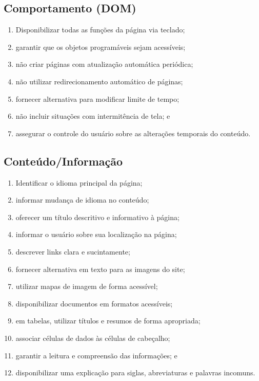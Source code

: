 \documentclass[
  12pt,
  openright,
  twoside,
  a4paper,
  english,
  french,
  spanish,
  brazil
]{abntex2}
\begin{document}
\subsection{Comportamento (DOM)}

\begin{enumerate}
  \item Disponibilizar todas as funções da página via teclado;
  \item garantir que os objetos programáveis sejam acessíveis;
  \item não criar páginas com atualização automática periódica;
  \item não utilizar redirecionamento automático de páginas;
  \item fornecer alternativa para modificar limite de tempo;
  \item não incluir situações com intermitência de tela; e
  \item
    assegurar o controle do usuário sobre as alterações temporais do conteúdo.
\end{enumerate}

\subsection{Conteúdo/Informação}

\begin{enumerate}
  \item Identificar o idioma principal da página;
  \item informar mudança de idioma no conteúdo;
  \item oferecer um título descritivo e informativo à página;
  \item informar o usuário sobre sua localização na página;
  \item descrever links clara e sucintamente;
  \item fornecer alternativa em texto para as imagens do site;
  \item utilizar mapas de imagem de forma acessível;
  \item disponibilizar documentos em formatos acessíveis;
  \item em tabelas, utilizar títulos e resumos de forma apropriada;
  \item associar células de dados às células de cabeçalho;
  \item garantir a leitura e compreensão das informações; e
  \item
    disponibilizar uma explicação para siglas, abreviaturas e palavras incomuns.
\end{enumerate}
\end{document}
